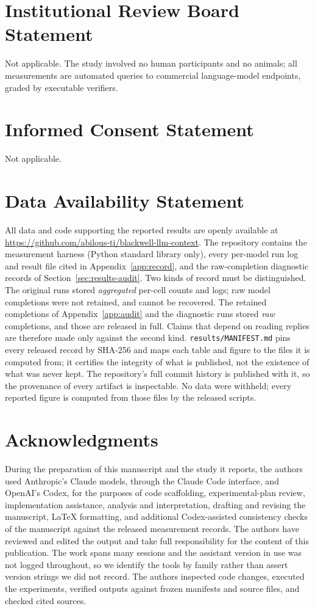 \documentclass[11pt]{article}
\theoremstyle{plain}
\theoremstyle{definition}
\theoremstyle{remark}
\begin{document}
\section*{Institutional Review Board Statement}
Not applicable. The study involved no human participants and no animals; all measurements are
automated queries to commercial language-model endpoints, graded by executable verifiers.

\section*{Informed Consent Statement}
Not applicable.

\section*{Data Availability Statement}
All data and code supporting the reported results are openly available at
\url{https://github.com/abilous-ti/blackwell-llm-context}. The repository contains the measurement
harness (Python standard library only), every per-model run log and result file cited in
Appendix~\ref{app:record}, and the raw-completion diagnostic records of
Section~\ref{sec:results-audit}. Two kinds of record must be distinguished. The original runs stored
\emph{aggregated} per-cell counts and logs; raw model completions were not retained, and cannot be
recovered. The retained completions of Appendix~\ref{app:audit} and the diagnostic runs stored
\emph{raw} completions, and those are released in full. Claims that depend on reading replies are
therefore made only against the second kind. \texttt{results/MANIFEST.md} pins every released
record by SHA-256 and maps each table and figure to the files it is computed from; it certifies
the integrity of what is published, not the existence of what was never kept. The repository's
full commit history is published with it, so the provenance of every artifact is inspectable. No
data were withheld; every reported figure is computed from those files by the released scripts.

\section*{Acknowledgments}
During the preparation of this manuscript and the study it reports, the authors used Anthropic's
Claude models, through the Claude Code interface, and OpenAI's Codex, for the purposes of code
scaffolding, experimental-plan review, implementation assistance, analysis and interpretation,
drafting and revising the manuscript, LaTeX formatting, and additional Codex-assisted
consistency checks of the manuscript against the released measurement records. The authors have
reviewed and edited the output and take full responsibility for the content of this publication.
The work spans many sessions and the assistant version in use was not logged throughout, so we
identify the tools by family rather than assert version strings we did not record. The authors
inspected code changes, executed the experiments, verified outputs against frozen manifests and
source files, and checked cited sources.
\end{document}
